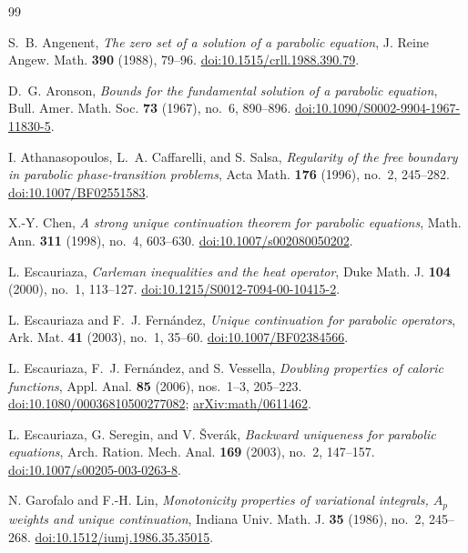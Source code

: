 \documentclass[11pt,reqno]{amsart}
\numberwithin{equation}{section}
\theoremstyle{definition}
\theoremstyle{remark}
\begin{document}
\begin{thebibliography}{99}

S.~B. Angenent, \emph{The zero set of a solution of a parabolic equation},
J. Reine Angew. Math. \textbf{390} (1988), 79--96.
\href{https://doi.org/10.1515/crll.1988.390.79}{doi:10.1515/crll.1988.390.79}.

D.~G. Aronson, \emph{Bounds for the fundamental solution of a parabolic equation},
Bull. Amer. Math. Soc. \textbf{73} (1967), no.~6, 890--896.
\href{https://doi.org/10.1090/S0002-9904-1967-11830-5}{doi:10.1090/S0002-9904-1967-11830-5}.

I. Athanasopoulos, L.~A. Caffarelli, and S. Salsa,
\emph{Regularity of the free boundary in parabolic phase-transition problems},
Acta Math. \textbf{176} (1996), no.~2, 245--282.
\href{https://doi.org/10.1007/BF02551583}{doi:10.1007/BF02551583}.

X.-Y. Chen, \emph{A strong unique continuation theorem for parabolic equations},
Math. Ann. \textbf{311} (1998), no.~4, 603--630.
\href{https://doi.org/10.1007/s002080050202}{doi:10.1007/s002080050202}.

L. Escauriaza, \emph{Carleman inequalities and the heat operator},
Duke Math. J. \textbf{104} (2000), no.~1, 113--127.
\href{https://doi.org/10.1215/S0012-7094-00-10415-2}{doi:10.1215/S0012-7094-00-10415-2}.

L. Escauriaza and F.~J. Fern\'andez,
\emph{Unique continuation for parabolic operators},
Ark. Mat. \textbf{41} (2003), no.~1, 35--60.
\href{https://doi.org/10.1007/BF02384566}{doi:10.1007/BF02384566}.

L. Escauriaza, F.~J. Fern\'andez, and S. Vessella,
\emph{Doubling properties of caloric functions},
Appl. Anal. \textbf{85} (2006), nos.~1--3, 205--223.
\href{https://doi.org/10.1080/00036810500277082}{doi:10.1080/00036810500277082};
\href{https://arxiv.org/abs/math/0611462}{arXiv:math/0611462}.

L. Escauriaza, G. Seregin, and V. \v Sver\'ak,
\emph{Backward uniqueness for parabolic equations},
Arch. Ration. Mech. Anal. \textbf{169} (2003), no.~2, 147--157.
\href{https://doi.org/10.1007/s00205-003-0263-8}{doi:10.1007/s00205-003-0263-8}.

N. Garofalo and F.-H. Lin,
\emph{Monotonicity properties of variational integrals, $A_p$ weights and unique continuation},
Indiana Univ. Math. J. \textbf{35} (1986), no.~2, 245--268.
\href{https://doi.org/10.1512/iumj.1986.35.35015}{doi:10.1512/iumj.1986.35.35015}.


\end{thebibliography}
\end{document}
